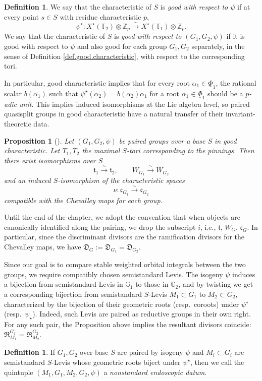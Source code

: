\documentclass[openany]{amsbook}
\newtheorem{proposition}[theorem]{Proposition}
\theoremstyle{definition}
\newtheorem{definition}[theorem]{Definition}
\theoremstyle{remark}
\numberwithin{equation}{section}
\newcommand{\Z}{\mathbb{Z}}
\newcommand{\G}{\mathbb{G}}
\newcommand{\T}{\mathbb{T}}
\newcommand{\ul}[1]{\underline{#1}}
\renewcommand{\-}{\operatorname{-}}
\renewcommand{\t}{\mathfrak{t}}
\newcommand{\ft}{\mathfrak{t}}
\newcommand{\fc}{\mathfrak{c}}
\newcommand{\fD}{\mathfrak{D}}
\newcommand{\fR}{\mathfrak{R}}
\begin{document}
\begin{definition}\label{def.good.char.pair}
    We say that the characteristic of $S$ is \emph{good with respect to $\psi$} if at every point $s \in S$ with residue characteristic $p$, 
    $$
        \psi^\star : X^\star(\T_2) \otimes \Z_p \xrightarrow{\sim} X^\star(\T_1) \otimes \Z_p.
    $$
    We say that the characteristic of $S$ is \emph{good with respect to $(G_1, G_2, \psi)$} if it is good with respect to $\psi$ and also good for each group $G_1, G_2$ separately, in the sense of Definition \ref{def.good.characteristic}, with respect to the corresponding tori. 
\end{definition}
    In particular, good characteristic implies that for every root $\alpha_1 \in \ul{\Phi}_1$, the rational scalar $b(\alpha_1)$ such that $\psi^\star(\alpha_2) = b(\alpha_2) \alpha_1$ for a root $\alpha_1 \in \ul{\Phi}_1$ should be a \emph{$p$-adic unit}. This implies induced isomorphisms at the Lie algebra level, so paired quasisplit groups in good characteristic have a natural transfer of their invariant-theoretic data. 
\begin{proposition}[{\cite[Lemme 1.12.6, Lemme 2.4.7]{ngofl}}]\label{prop.paired.gps.invariants.correspond}
    Let $(G_1, G_2, \psi)$ be paired groups over a base $S$ in good characteristic. Let $T_1, T_2$ the maximal $S$-tori corresponding to the pinnings. Then there exist isomorphisms over $S$
    $$
        \ft_1 \xrightarrow{\sim} \ft_2, \qquad W_{G_1} \xrightarrow{\sim} W_{G_2}
    $$
    and an induced $S$-isomorphism of the characteristic spaces
    $$
        \nu : \fc_{G_1} \xrightarrow{\sim} \fc_{G_2}
    $$
    compatible with the Chevalley maps for each group.
\end{proposition}
 Until the end of the chapter, we adopt the convention that when objects are canonically identified along the pairing, we drop the subscript $i$, i.e., $\t$, $W_G$, $\fc_G$. In particular, since the discriminant divisors are the ramification divisors for the Chevalley maps, we have $\fD_G := \fD_{G_1} = \fD_{G_2}$.

Since our goal is to compare stable weighted orbital integrals between the two groups, we require compatibly chosen semistandard Levis. The isogeny $\psi$ induces a bijection from semistandard Levis in $\G_1$ to those in $\G_2$, and by twisting we get a corresponding bijection from semistandard $S$-Levis $M_1 \subset G_1$ to $M_2 \subset G_2$, characterized by the bijection of their geometric roots (resp.\ coroots) under $\psi^\star$ (resp.\ $\psi_\star$). Indeed, such Levis are paired as reductive groups in their own right. For any such pair, the Proposition above implies the resultant divisors coincide: $\fR_{M_1}^{G_1} = \fR_{M_2}^{G_2}$.
\begin{definition}\label{def.nonstd.datum}
    If $G_1, G_2$ over base $S$ are paired by isogeny $\psi$ and $M_i \subset G_i$ are semistandard $S$-Levis whose geometric roots biject under $\psi^\star$, then we call the quintuple $(M_1, G_1, M_2, G_2, \psi)$ a \emph{nonstandard endoscopic datum}.
\end{definition}
\end{document}
